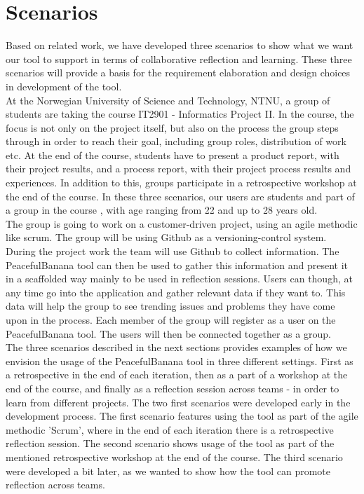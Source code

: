 \section{Scenarios}
\label{problemdefinition}
Based on related work, we have developed three scenarios to show what we want our tool to support in terms of collaborative reflection and learning. These three scenarios will provide a basis for the requirement elaboration and design choices in development of the tool. 
\\
At the Norwegian University of Science and Technology, NTNU, a group of students are taking the course IT2901 - Informatics Project II\footnotemark.
In the course, the focus is not only on the project itself, but also on the process the group steps through in order to reach their goal, including group roles, distribution of work etc. At the end of the course, students have to present a product report, with their project results, and a process report, with their project process results and experiences. In addition to this, groups participate in a retrospective workshop at the end of the course. In these three scenarios, our users are students and part of a group in the course , with age ranging from 22 and up to 28 years old.
\\
The group is going to work on a customer-driven project, using an agile methodic like scrum. The group will be using Github as a versioning-control system. During the project work the team will use Github to collect information. The PeacefulBanana tool can then be used to gather this information and present it in a scaffolded way mainly to be used in reflection sessions. Users can though, at any time go into the application and gather relevant data if they want to. This data will help the group to see trending issues and problems they have come upon in the process. Each member of the group will register as a user on the PeacefulBanana tool. The users will then be connected together as a group. 
\\
The three scenarios described in the next sections provides examples of how we envision the usage of the PeacefulBanana tool in three different settings. First as a retrospective in the end of each iteration, then as a part of a workshop at the end of the course, and finally as a reflection session across teams - in order to learn from different projects. 
The two first scenarios were developed early in the development process. The first scenario features using the tool as part of the agile methodic 'Scrum', where in the end of each iteration there is a retrospective reflection session. The second scenario shows usage of the tool as part of the mentioned retrospective workshop at the end of the course. The third scenario were developed a bit later, as we wanted to show how the tool can promote reflection across teams. 
\\

